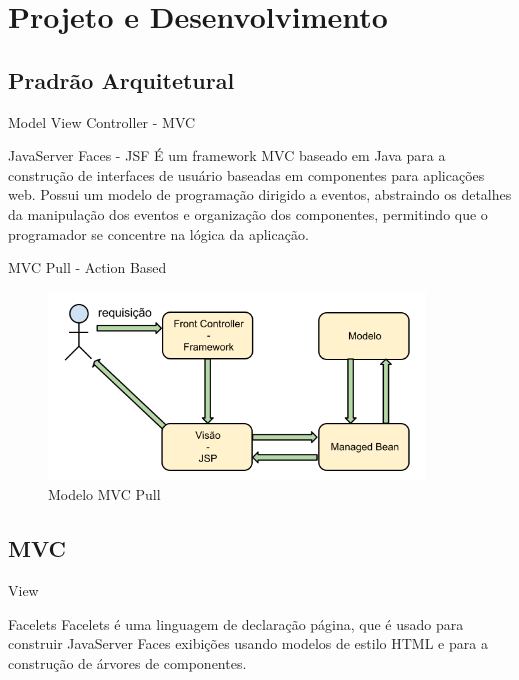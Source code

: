 \documentclass[xcolor=dvipsnames]{beamer}
\begin{document}
\section{Projeto e Desenvolvimento}
   \subsection{Pradrão Arquitetural}
	\begin{frame}{Model View Controller - MVC}
		\begin{block}{JavaServer Faces - JSF}	
É um framework MVC baseado em Java para a construção de interfaces de usuário baseadas em componentes para aplicações web. Possui um modelo de programação dirigido a eventos, abstraindo os detalhes da manipulação dos eventos e organização dos componentes, permitindo que o programador se concentre na lógica da aplicação.	
		\end{block}
	\end{frame}

	\begin{frame}{MVC Pull - Action Based}
		\begin{figure}[!htb]
			\centering
			\includegraphics[keepaspectratio=true,height=5cm]{mvc-pull.png}
			\caption{Modelo MVC Pull}
			\label{rec-ER}
		\end{figure}				

	\end{frame}	

\subsection{MVC}
	\begin{frame}[fragile]{View}
		\begin{block}{Facelets}
Facelets é uma linguagem de declaração página, que é usado para construir JavaServer Faces exibições usando modelos de estilo HTML e para a construção de árvores de componentes.
		\end{block}
	\end{frame}	
\end{document}
